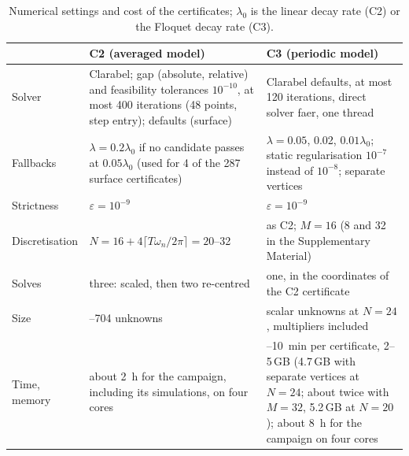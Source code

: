 \begin{table}[!tbp]
\centering
\caption{Numerical settings and cost of the certificates; $\lambda_0$ is the linear decay rate (C2) or the Floquet decay rate (C3).}
\label{tab:lmi-settings}
\small
\begin{tabular}{@{}>{\raggedright\arraybackslash}p{}>{\raggedright\arraybackslash}p{}>{\raggedright\arraybackslash}p{}@{}}
\toprule
 & C2 (averaged model) & C3 (periodic model)\\
\midrule
Solver & Clarabel; gap (absolute, relative) and feasibility tolerances $10^{-10}$, at most 400 iterations (48 points, step entry); defaults (surface) & Clarabel defaults, at most 120 iterations, direct solver faer, one thread\\
Fallbacks & $\lambda=0.2\lambda_0$ if no candidate passes at $0.05\lambda_0$ (used for 4 of the 287 surface certificates) & $\lambda=0.05$, 0.02, $0.01\lambda_0$; static regularisation $10^{-7}$ instead of $10^{-8}$; separate vertices\\
Strictness & $\varepsilon=10^{-9}$ & $\varepsilon=10^{-9}$\\
Discretisation & $N=16+4\lceil T\omega_n/2\pi\rceil=20$--32 & as C2; $M=16$ (8 and 32 in the Supplementary Material)\\
Solves & three: scaled, then two re-centred & one, in the coordinates of the C2 certificate\\
Size & 326--704 unknowns & 7009 scalar unknowns at $N=24$, multipliers included\\
Time, memory & about \SI{2}{\hour} for the campaign, including its simulations, on four cores & 4--\SI{10}{\minute} per certificate, 2--5\,GB (4.7\,GB with separate vertices at $N=24$; about twice with $M=32$, 5.2\,GB at $N=20$); about \SI{8}{\hour} for the campaign on four cores\\
\bottomrule
\end{tabular}
\end{table}

